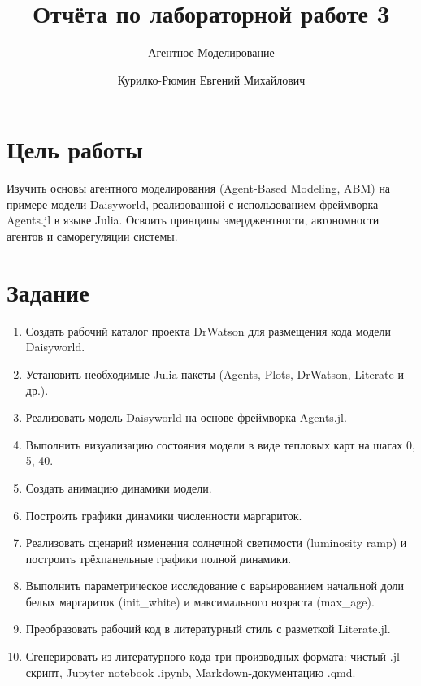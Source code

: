 \documentclass[
  12pt,
  a4paper,
  DIV=11,
  numbers=noendperiod]{scrreprt}
\title{Отчёта по лабораторной работе 3}
\subtitle{Агентное Моделирование}
\author{Курилко-Рюмин Евгений Михайлович}
\date{}
\providecommand{\tightlist}{%
  \setlength{\itemsep}{0pt}\setlength{\parskip}{0pt}}\usepackage{longtable,booktabs,array}
\renewcommand*\contentsname{Содержание}
\newcommand\contentsname{Содержание}
\begin{document}
\maketitle

\renewcommand*\contentsname{Содержание}
{
\setcounter{tocdepth}{1}
\tableofcontents
}
\listoffigures
\listoftables

\chapter{Цель
работы}\label{ux446ux435ux43bux44c-ux440ux430ux431ux43eux442ux44b}

Изучить основы агентного моделирования (Agent-Based Modeling, ABM) на
примере модели Daisyworld, реализованной с использованием фреймворка
Agents.jl в языке Julia. Освоить принципы эмерджентности, автономности
агентов и саморегуляции системы.

\chapter{Задание}\label{ux437ux430ux434ux430ux43dux438ux435}

\begin{enumerate}
\def\labelenumi{\arabic{enumi}.}
\tightlist
\item
  Создать рабочий каталог проекта DrWatson для размещения кода модели
  Daisyworld.
\item
  Установить необходимые Julia-пакеты (Agents, Plots, DrWatson, Literate
  и др.).
\item
  Реализовать модель Daisyworld на основе фреймворка Agents.jl.
\item
  Выполнить визуализацию состояния модели в виде тепловых карт на шагах
  0, 5, 40.
\item
  Создать анимацию динамики модели.
\item
  Построить графики динамики численности маргариток.
\item
  Реализовать сценарий изменения солнечной светимости (luminosity ramp)
  и построить трёхпанельные графики полной динамики.
\item
  Выполнить параметрическое исследование с варьированием начальной доли
  белых маргариток (init\_white) и максимального возраста (max\_age).
\item
  Преобразовать рабочий код в литературный стиль с разметкой
  Literate.jl.
\item
  Сгенерировать из литературного кода три производных формата: чистый
  .jl-скрипт, Jupyter notebook .ipynb, Markdown-документацию .qmd.
\end{enumerate}
\end{document}
